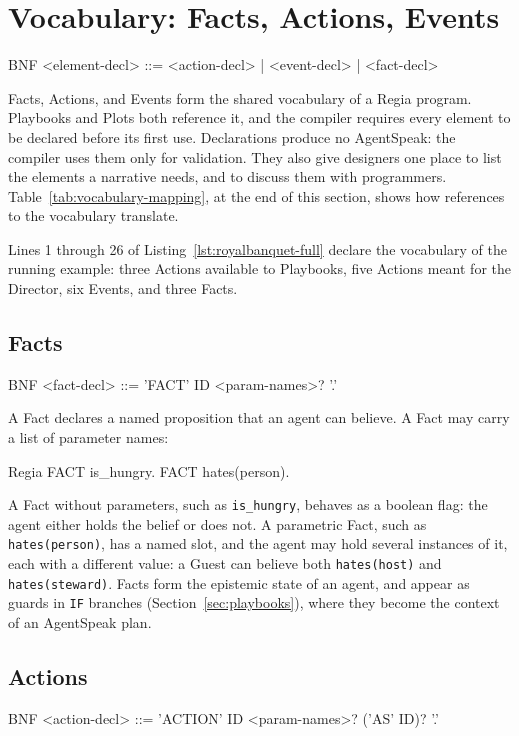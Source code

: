 \section{Vocabulary: Facts, Actions, Events}
\label{sec:vocabulary}
\begin{codeblock}[]{BNF}
    <element-decl>   ::= <action-decl>
                       | <event-decl>
                       | <fact-decl>
\end{codeblock}
Facts, Actions, and Events form the shared vocabulary of a Regia program. Playbooks and Plots both reference it, and the compiler requires every element to be declared before its first use. Declarations produce no AgentSpeak: the compiler uses them only for validation. They also give designers one place to list the elements a narrative needs, and to discuss them with programmers. Table~\ref{tab:vocabulary-mapping}, at the end of this section, shows how references to the vocabulary translate.
 
Lines 1 through 26 of Listing~\ref{lst:royalbanquet-full} declare the vocabulary of the running example: three Actions available to Playbooks, five Actions meant for the Director, six Events, and three Facts.
 
\subsection{Facts}
\begin{codeblock}[]{BNF}
    <fact-decl>      ::= 'FACT' ID <param-names>? '.'
\end{codeblock}
 
A Fact declares a named proposition that an agent can believe. A Fact may carry a list of parameter names:
 
\begin{codeblock}[]{Regia}
    FACT is_hungry.
    FACT hates(person).
\end{codeblock}
 
A Fact without parameters, such as \lstinline|is_hungry|, behaves as a boolean flag: the agent either holds the belief or does not. A parametric Fact, such as \lstinline|hates(person)|, has a named slot, and the agent may hold several instances of it, each with a different value: a Guest can believe both \lstinline|hates(host)| and \lstinline|hates(steward)|. Facts form the epistemic state of an agent, and appear as guards in \lstinline|IF| branches (Section~\ref{sec:playbooks}), where they become the context of an AgentSpeak plan.
 
\subsection{Actions}
\begin{codeblock}[]{BNF}
    <action-decl>    ::= 'ACTION' ID <param-names>? ('AS' ID)? '.'
\end{codeblock}
 
